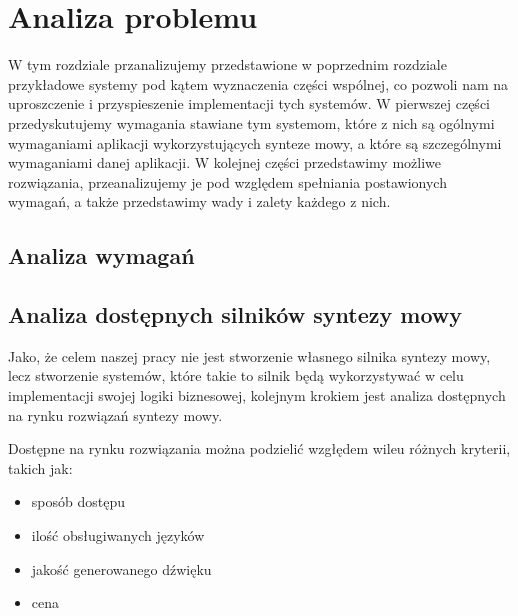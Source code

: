 
\chapter{Analiza problemu} %



\ifpdf
    \graphicspath{{X/figures/PNG/}{X/figures/PDF/}{X/figures/}}
\else
    \graphicspath{{X/figures/EPS/}{X/figures/}}
\fi



W tym rozdziale przanalizujemy przedstawione w poprzednim rozdziale przykładowe systemy pod kątem wyznaczenia części wspólnej, co pozwoli nam na uproszczenie i przyspieszenie implementacji tych systemów. W pierwszej części przedyskutujemy wymagania stawiane tym systemom, które z nich są ogólnymi wymaganiami aplikacji wykorzystujących synteze mowy, a które są szczególnymi wymaganiami danej aplikacji. W kolejnej części przedstawimy możliwe rozwiązania, przeanalizujemy je pod względem spełniania postawionych wymagań, a także przedstawimy wady i zalety każdego z nich.

\section {Analiza wymagań}

\section {Analiza dostępnych silników syntezy mowy}

Jako, że celem naszej pracy nie jest stworzenie własnego silnika syntezy mowy, lecz stworzenie systemów, które takie to silnik będą wykorzystywać w celu implementacji swojej logiki biznesowej, kolejnym krokiem jest analiza dostępnych na rynku rozwiązań syntezy mowy. 

Dostępne na rynku rozwiązania można podzielić wzgłędem wileu różnych kryterii, takich jak:
\begin{itemize}
	\item sposób dostępu
	\item ilość obsługiwanych języków
	\item jakość generowanego dźwięku
	\item cena
\end{itemize}

